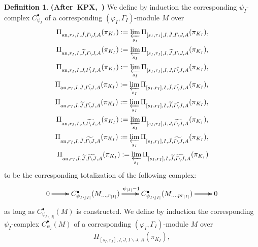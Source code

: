 \documentclass[12pt]{amsart}
\theoremstyle{definition}
\newtheorem{definition}[theorem]{Definition}
\numberwithin{equation}{section}
\begin{document}
\begin{definition} \mbox{\bf{(After KPX, \cite[Definition 2.3.3]{KPX})}}
We define by induction the corresponding $\psi_I$-complex $C^\bullet_{\psi_I}$ of a corresponding $(\varphi_I,\Gamma_I)$-module $M$ over 
\begin{align}
\Pi_{\mathrm{an},r_I,I,\breve{J},I\backslash J,A}(\pi_{K_I}):=\varprojlim_{s_I}\Pi_{[s_I,r_I],I,\breve{J},I\backslash J,A}(\pi_{K_I}),\\	
\Pi_{\mathrm{an},r_I,I,\widetilde{J},I\backslash J,A}(\pi_{K_I}):=\varprojlim_{s_I} \Pi_{[s_I,r_I],I,\widetilde{J},I\backslash J,A}(\pi_{K_I}),\\
\Pi_{\mathrm{an},r_I,I,J,\breve{I\backslash J},A}(\pi_{K_I}):=\varprojlim_{s_I}\Pi_{[s_I,r_I],I,J,\breve{I\backslash J},A}(\pi_{K_I}),\\	
\Pi_{\mathrm{an},r_I,I,\breve{J},\breve{I\backslash J},A}(\pi_{K_I}):=\varprojlim_{s_I} \Pi_{[s_I,r_I],I,\breve{J},\breve{I\backslash J},A}(\pi_{K_I}),\\	
\Pi_{\mathrm{an},r_I,I,\widetilde{J},\breve{I\backslash J},A}(\pi_{K_I}):=\varprojlim_{s_I} \Pi_{[s_I,r_I],I,\widetilde{J},\breve{I\backslash J},A}(\pi_{K_I}),\\
\Pi_{\mathrm{an},r_I,I,J,\widetilde{I\backslash J},A}(\pi_{K_I}):=\varprojlim_{s_I} \Pi_{[s_I,r_I],I,J,\widetilde{I\backslash J},A}(\pi_{K_I}),\\	
\Pi_{\mathrm{an},r_I,I,\breve{J},\widetilde{I\backslash J},A}(\pi_{K_I}):=\varprojlim_{s_I} \Pi_{[s_I,r_I],I,\breve{J},\widetilde{I\backslash J},A}(\pi_{K_I}),\\	
\Pi_{\mathrm{an},r_I,I,\widetilde{J},\widetilde{I\backslash J},A}(\pi_{K_I}):=\varprojlim_{s_I} \Pi_{[s_I,r_I],I,\widetilde{J},\widetilde{I\backslash J},A}(\pi_{K_I})	
\end{align}
to be the corresponding totalization of the following complex:
\[
\xymatrix@C+0pc@R+0pc{
0 \ar[r] \ar[r] \ar[r] &C^\bullet_{\psi_{I\backslash |I|}}(M_{...,r_{|I|}}) \ar[r]^{\psi_{|I|}-1}\ar[r]\ar[r] &C^\bullet_{\psi_{I\backslash |I|}}(M_{...,pr_{|I|}}) \ar[r] \ar[r] \ar[r] &0
}
\]
as long as $C^\bullet_{\psi_{I\backslash |I|}}(M)$ is constructed. We define by induction the corresponding $\psi_I$-complex $C^\bullet_{\psi_I}(M)$ of a corresponding $(\varphi_I,\Gamma_I)$-module $M$ over
\begin{align}
\Pi_{[s_I,r_I],I,\breve{J},I\backslash J,A}(\pi_{K_I}),\\	

\end{align}
\end{definition}
\end{document}

